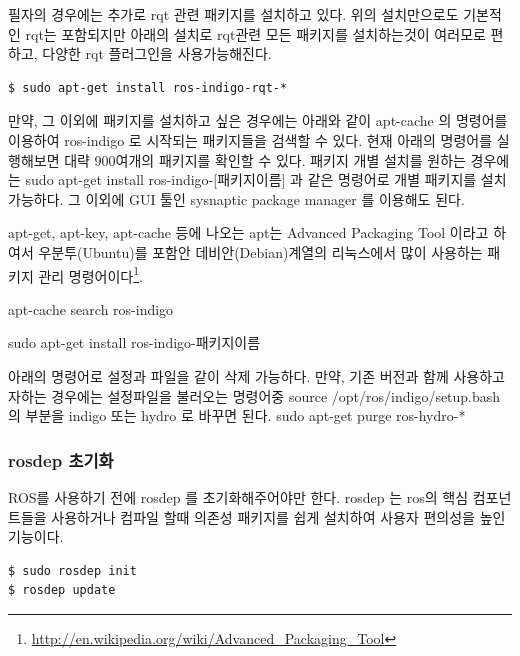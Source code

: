 필자의 경우에는 추가로 rqt 관련 패키지를 설치하고 있다. 위의 설치만으로도 기본적인 rqt는 포함되지만 아래의 설치로 rqt관련 모든 패키지를 설치하는것이 여러모로 편하고, 다양한 rqt 플러그인을 사용가능해진다.
\\
\begin{lstlisting}[language=ROS]
$ sudo apt-get install ros-indigo-rqt-*
\end{lstlisting}

만약, 그 이외에 패키지를 설치하고 싶은 경우에는 아래와 같이 apt-cache 의 명령어를 이용하여 ros-indigo 로 시작되는 패키지들을 검색할 수 있다. 현재 아래의 명령어를 실행해보면 대략 900여개의 패키지를 확인할 수 있다. 패키지 개별 설치를 원하는 경우에는 sudo apt-get install ros-indigo-[패키지이름] 과 같은 명령어로 개별 패키지를 설치 가능하다. 그 이외에 GUI 툴인 sysnaptic package manager 를 이용해도 된다.

\begin{exercise}
apt-get, apt-key, apt-cache 등에 나오는 apt는 Advanced Packaging Tool 이라고 하여서 우분투(Ubuntu)를 포함안 데비안(Debian)계열의 리눅스에서 많이 사용하는 패키지 관리 명령어이다\footnote{\url{http://en.wikipedia.org/wiki/Advanced_Packaging_Tool}}.
\end{exercise}

\begin{exercise}[패키지 검색 방법]
apt-cache search ros-indigo
\end{exercise}

\begin{exercise}[패키지 개별 설치 방법]
sudo apt-get install ros-indigo-패키지이름
\end{exercise}

\begin{exercise}
아래의 명령어로 설정과 파일을 같이 삭제 가능하다. 만약, 기존 버전과 함께 사용하고자하는 경우에는 설정파일을 불러오는 명령어중 source /opt/ros/indigo/setup.bash 의 부분을 indigo 또는 hydro 로 바꾸면 된다. sudo apt-get purge ros-hydro-*
\end{exercise}

\subsubsection{rosdep 초기화}
ROS를 사용하기 전에 rosdep 를 초기화해주어야만 한다. rosdep 는 ros의 핵심 컴포넌트들을 사용하거나 컴파일 할때 의존성 패키지를 쉽게 설치하여 사용자 편의성을 높인 기능이다.
\\
\begin{lstlisting}[language=ROS]
$ sudo rosdep init
$ rosdep update
\end{lstlisting}

